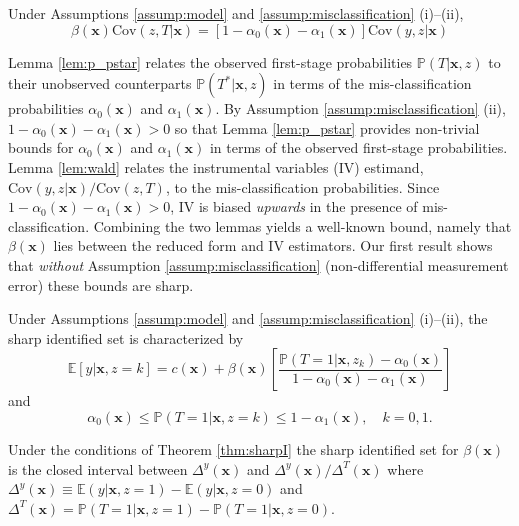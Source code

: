 \begin{lem}
  \label{lem:wald}
  Under Assumptions \ref{assump:model} and \ref{assump:misclassification} (i)--(ii), $$\beta(\mathbf{x}) \mbox{Cov}(z,T|\mathbf{x}) = \left[ 1 - \alpha_0(\mathbf{x}) - \alpha_1(\mathbf{x}) \right]\mbox{Cov}(y,z|\mathbf{x})$$
\end{lem}

Lemma \ref{lem:p_pstar} relates the observed first-stage probabilities $\mathbb{P}(T|\mathbf{x},z)$ to their unobserved counterparts $\mathbb{P}(T^*|\mathbf{x},z)$ in terms of the mis-classification probabilities $\alpha_0(\mathbf{x})$ and $\alpha_1(\mathbf{x})$.
By Assumption \ref{assump:misclassification} (ii), $1 - \alpha_0(\mathbf{x}) - \alpha_1(\mathbf{x}) > 0$ so that Lemma \ref{lem:p_pstar} provides non-trivial bounds for $\alpha_0(\mathbf{x})$ and $\alpha_1(\mathbf{x})$ in terms of the observed first-stage probabilities.
Lemma \ref{lem:wald} relates the instrumental variables (IV) estimand, $\mbox{Cov}(y,z|\mathbf{x})/\mbox{Cov}(z,T)$, to the mis-classification probabilities.
Since $1 - \alpha_0(\mathbf{x}) - \alpha_1(\mathbf{x}) > 0$, IV is biased \emph{upwards} in the presence of mis-classification.
Combining the two lemmas yields a well-known bound, namely that $\beta(\mathbf{x})$ lies between the reduced form and IV estimators.
Our first result shows that \emph{without} Assumption \ref{assump:misclassification} (non-differential measurement error) these bounds are sharp.

\begin{thm}
  Under Assumptions \ref{assump:model} and \ref{assump:misclassification} (i)--(ii), the sharp identified set is characterized by 
  \begin{equation}
    \mathbb{E}[y|\mathbf{x},z=k] = c(\mathbf{x}) + \beta(\mathbf{x}) \left[\frac{\mathbb{P}(T=1|\mathbf{x},z_k) - \alpha_0(\mathbf{x})}{1 - \alpha_0(\mathbf{x}) - \alpha_1(\mathbf{x})}\right]
    \label{eq:identsetI}
  \end{equation}
and
\[\alpha_0(\mathbf{x}) \leq \mathbb{P}(T=1|\mathbf{x}, z=k) \leq 1 -  \alpha_1(\mathbf{x}), \quad k = 0, 1.\]
  \label{thm:sharpI}
\end{thm}

\begin{cor}
  Under the conditions of Theorem \ref{thm:sharpI} the sharp identified set for $\beta(\mathbf{x})$ is the closed interval between $\Delta^y(\mathbf{x})$ and $\Delta^y(\mathbf{x})/\Delta^T(\mathbf{x})$ 
where $\Delta^y(\mathbf{x}) \equiv \mathbb{E}(y|\mathbf{x},z=1) - \mathbb{E}(y|\mathbf{x},z=0)$ and $\Delta^T(\mathbf{x})= \mathbb{P}(T=1|\mathbf{x},z=1) - \mathbb{P}(T=1|\mathbf{x},z=0)$.
\label{cor:sharpBeta1}
\end{cor}

